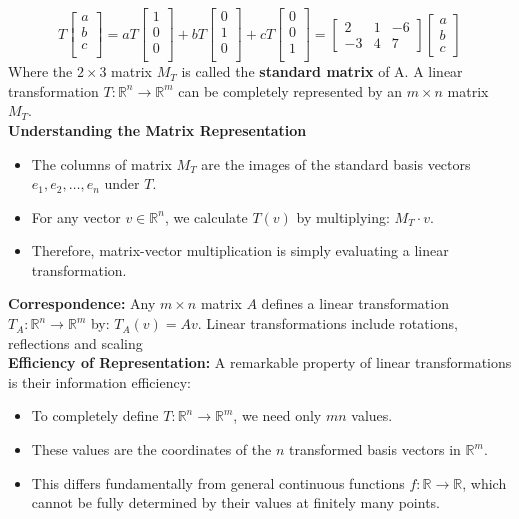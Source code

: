 \documentclass[a4paper, 9pt]{extarticle}
\begin{document}
$$
  T\begin{bmatrix}
    a \\
    b \\
    c \\
  \end{bmatrix}
  = aT\begin{bmatrix}
    1 \\
    0 \\
    0 \\
  \end{bmatrix}
  + bT\begin{bmatrix}
    0 \\
    1 \\
    0 \\
  \end{bmatrix}
  + cT\begin{bmatrix}
    0 \\
    0 \\
    1 \\
  \end{bmatrix}
  = \begin{bmatrix}
    2  & 1 & -6 \\
    -3 & 4 & 7
  \end{bmatrix}
  \begin{bmatrix}
    a \\
    b \\
    c
  \end{bmatrix}
$$
Where the $2\times 3$ matrix $M_T$ is called the \textbf{standard matrix} of A.
A linear transformation $T: \mathbb{R}^n \rightarrow \mathbb{R}^m$ can be completely represented by an $m \times n$ matrix $M_T$. \\[2ex]
\textbf{Understanding the Matrix Representation}
\begin{itemize}
  \item The columns of matrix $M_T$ are the images of the standard basis vectors $e_1, e_2, \ldots, e_n$ under $T$.
  \item For any vector $v \in \mathbb{R}^n$, we calculate $T(v)$ by multiplying: $M_T \cdot v$.
  \item Therefore, matrix-vector multiplication is simply evaluating a linear transformation.
\end{itemize}
\textbf{Correspondence:} Any $m \times n$ matrix $A$ defines a linear transformation $T_A: \mathbb{R}^n \rightarrow \mathbb{R}^m$ by: $T_A(v) = Av$. Linear transformations include rotations, reflections and scaling \\[2ex]
\textbf{Efficiency of Representation:} A remarkable property of linear transformations is their information efficiency:
\begin{itemize}
  \item To completely define $T: \mathbb{R}^n \rightarrow \mathbb{R}^m$, we need only $mn$ values.
  \item These values are the coordinates of the $n$ transformed basis vectors in $\mathbb{R}^m$.
  \item This differs fundamentally from general continuous functions $f: \mathbb{R} \rightarrow \mathbb{R}$, which cannot be fully determined by their values at finitely many points.
\end{itemize}
\end{document}
